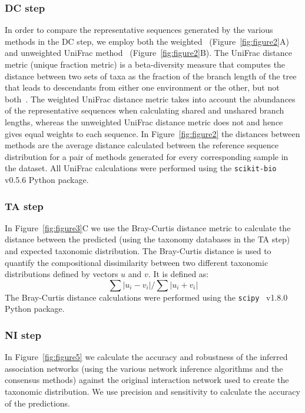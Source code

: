   \subsubsection*{DC step}
  \vspace{-5mm}
  In order to compare the representative sequences generated by the various methods in the DC step, we employ both the weighted~\cite{Lozupone2007} (Figure~\ref{fig:figure2}A) and unweighted UniFrac method~\cite{Lozupone2005} (Figure~\ref{fig:figure2}B).
  The UniFrac distance metric (unique fraction metric) is a beta-diversity measure that computes the distance between two sets of taxa as the fraction of the branch length of the tree that leads to descendants from either one environment or the other, but not both~\cite{Lozupone2005}.
  The weighted UniFrac distance metric takes into account the abundances of the representative sequences when calculating shared and unshared branch lengths, whereas the unweighted UniFrac distance metric does not and hence gives equal weights to each sequence.
  In Figure~\ref{fig:figure2} the distances between methods are the average distance calculated between the reference sequence distribution for a pair of methods generated for every corresponding sample in the dataset.
  All UniFrac calculations were performed using the \texttt{scikit-bio}~\cite{thescikit-biodevelopmentteamScikitbioBioinformaticsLibrary2022} v0.5.6 Python package.

  \subsubsection*{TA step}
  \vspace{-5mm}
  In Figure~\ref{fig:figure3}C we use the Bray-Curtis distance metric to calculate the distance between the predicted (using the taxonomy databases in the TA step) and expected taxonomic distribution.
  The Bray-Curtis distance is used to quantify the compositional dissimilarity between two different taxonomic distributions defined by vectors $u$ and $v$.
  It is defined as:
  $$\sum{|u_i-v_i|} / \sum{|u_i+v_i|}$$
  The Bray-Curtis distance calculations were performed using the \texttt{scipy}~\cite{virtanenSciPyFundamentalAlgorithms2020} v1.8.0 Python package.

  \subsubsection*{NI step}
  \vspace{-5mm}
  In Figure~\ref{fig:figure5} we calculate the accuracy and robustness of the inferred association networks (using the various network inference algorithms and the consensus methods) against the original interaction network used to create the taxonomic distribution.
  We use precision and sensitivity to calculate the accuracy of the predictions.

